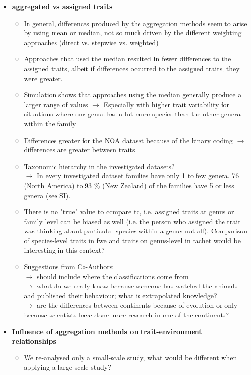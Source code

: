 \documentclass{article}
\begin{document}
\begin{itemize}
  \item \textbf{aggregated vs assigned traits}
  \begin{itemize}
    \item In general, differences produced by the aggregation methods seem to arise by using mean or median, not so much driven by the different weighting approaches (direct vs. stepwise vs. weighted)
    \item Approaches that used the median resulted in fewer differences to the assigned traits, albeit if differences occurred to the assigned traits, they were greater. 
    \item Simulation shows that approaches using the median generally produce a larger range of values $\rightarrow$ Especially with higher trait variability for situations where one genus has a lot more species than the other genera within the family 
    \item Differences greater for the NOA dataset because of the binary coding $\rightarrow$ differences are greater between traits
    \item Taxonomic hierarchy in the investigated datasets? \\
     $\rightarrow$ In every investigated dataset families have only 1 to few genera. 76 (North America) to 93 \% (New Zealand) of the families have 5 or less genera (see SI). 
    \item There is no "true" value to compare to, i.e. assigned traits at genus or family level can be biased as well (i.e. the person who assigned the trait was thinking about particular species within a genus not all). Comparison of species-level traits in fwe and traits on genus-level in tachet would be interesting in this context? 
    \item  Suggestions from Co-Authors: \\
     $\rightarrow$ should include where the classifications come from \\
     $\rightarrow$ what do we really know because someone has watched the animals and published their behaviour; what is extrapolated knowledge? \\
     $\rightarrow$ are the differences between continents because of evolution or only because scientists have done more research in one of the continents?
  \end{itemize}
  \item \textbf{Influence of aggregation methods on trait-environment relationships}
  \begin{itemize}
    \item We re-analysed only a small-scale study, what would be different when applying a large-scale study?
  \end{itemize}
\end{itemize}
\end{document}
